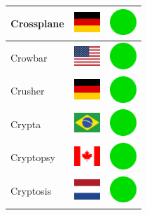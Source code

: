 \documentclass[12pt, a4paper, twoside]{report}
\begin{document}
\begin{center}
\begin{longtable}{|p{5cm}|p{2cm}|p{2cm}|}
 Crossplane                                                 & \includegraphics[width=1cm]{../4x3/de} &   \includegraphics[width=1cm]{../likes/y} \\ \hline
 Crowbar                                                    & \includegraphics[width=1cm]{../4x3/us} &   \includegraphics[width=1cm]{../likes/y} \\ \hline
 Crusher                                                    & \includegraphics[width=1cm]{../4x3/de} &   \includegraphics[width=1cm]{../likes/y} \\ \hline
 Crypta                                                     & \includegraphics[width=1cm]{../4x3/br} &   \includegraphics[width=1cm]{../likes/y} \\ \hline
 Cryptopsy                                                  & \includegraphics[width=1cm]{../4x3/ca} &   \includegraphics[width=1cm]{../likes/y} \\ \hline
 Cryptosis                                                  & \includegraphics[width=1cm]{../4x3/nl} &   \includegraphics[width=1cm]{../likes/y} \\ \hline

\end{longtable}
\end{center}
\end{document}
